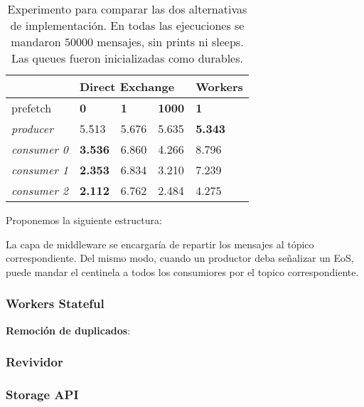 \documentclass[titlepage,a4paper,oneside]{article}
\begin{document}
\begin{table}[]
\centering
\begin{tabular}{l|llll|}
\cline{2-5}
\cellcolor[HTML]{FFFFFF}                  & \multicolumn{3}{l|}{\textbf{Direct Exchange}} & \textbf{Workers} \\ \hline
\multicolumn{1}{|l|}{prefetch} & \multicolumn{1}{l|}{\textbf{0}} & \multicolumn{1}{l|}{\textbf{1}} & \multicolumn{1}{l|}{\textbf{1000}} & \textbf{1} \\ \hline
\multicolumn{1}{|l|}{\textit{producer}}   & 5.513               & 5.676      & 5.635      & \textbf{5.343}   \\
\multicolumn{1}{|l|}{\textit{consumer 0}} & \textbf{3.536}      & 6.860      & 4.266      & 8.796            \\
\multicolumn{1}{|l|}{\textit{consumer 1}} & \textbf{2.353}      & 6.834      & 3.210      & 7.239            \\
\multicolumn{1}{|l|}{\textit{consumer 2}} & \textbf{2.112}      & 6.762      & 2.484      & 4.275            \\ \hline
\end{tabular}
\caption{Experimento para comparar las dos alternativas de implementación. En todas las ejecuciones se mandaron $50000$ mensajes, sin prints ni sleeps. Las queues fueron inicializadas como durables.}
\label{exp-dex-wrk}
\end{table}

Proponemos la siguiente estructura:

La capa de middleware se encargaría de repartir los mensajes al tópico correspondiente. Del mismo modo, cuando un productor deba señalizar un EoS, puede mandar el centinela a todos los consumiores por el topico correspondiente.

\subsubsection{Workers Stateful}
\textbf{Remoción de duplicados}:


\subsubsection{Revividor}

\subsubsection{Storage API}
\end{document}
